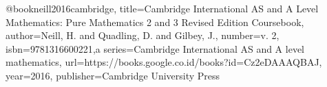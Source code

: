 @book{neill2016cambridge,
  title={Cambridge International AS and A Level Mathematics: Pure Mathematics 2 and 3 Revised Edition Coursebook},
  author={Neill, H. and Quadling, D. and Gilbey, J.},
  number={v. 2},
  isbn={9781316600221},a
  series={Cambridge International AS and A level mathematics},
  url={https://books.google.co.id/books?id=Cz2eDAAAQBAJ},
  year={2016},
  publisher={Cambridge University Press}
}
